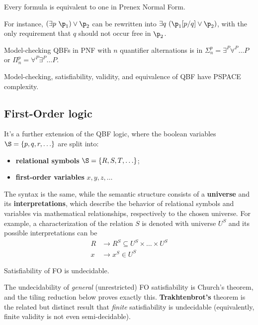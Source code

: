 \documentclass[oneside]{academica}
\begin{document}
\begin{lemma*}
  Every formula is equivalent to one in Prenex Normal Form.
\end{lemma*}

For instance, $( \exists p\ \p_1 ) \lor \p_2$ can be rewritten into $\exists q \ (\p_1[p/q] \lor \p_2)$, with the only requirement that $q$ should not occur free in $\p_2$.

\begin{lemma*}
  Model-checking QBFs in PNF with $n$ quantifier alternations is in $\Sigma^p_n = \exists^P \forall^P \ldots P$ or $\Pi^p_n = \forall^P \exists^P \ldots P$.
\end{lemma*}

Model-checking, satisfiability, validity, and equivalence of QBF have PSPACE complexity.

\subsection{First-Order logic}

It's a further extension of the QBF logic, where the boolean variables $\S = \{ p,q,r,\ldots \}$ are split into:
\begin{itemize}
  \item \textbf{relational symbols} $\S = \{ R,S,T,\ldots \}$;
  \item \textbf{first-order variables} $x,y,z,\ldots$
\end{itemize}
The syntax is the same, while the semantic structure consists of a \textbf{universe} and its \textbf{interpretations}, which describe the behavior of relational symbols and variables via mathematical relationships, respectively to the chosen universe.
For example, a characterization of the relation $S$ is denoted with universe $U^S$ and its possible interpretations can be
\begin{align*}
  R & \to R^S \subseteq U^S \times \ldots \times U^S \\
  x & \to x^S \in U^S
\end{align*}

\begin{theorem*}
  Satisfiability of FO is undecidable.
\end{theorem*}

\begin{note}
  The undecidability of \emph{general} (unrestricted) FO satisfiability is Church's theorem, and the tiling reduction below proves exactly this.
  \textbf{Trakhtenbrot's} theorem is the related but distinct result that \emph{finite} satisfiability is undecidable (equivalently, finite validity is not even semi-decidable).
\end{note}
\end{document}
